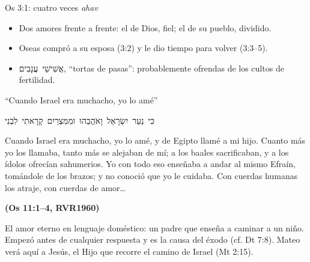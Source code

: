 \documentclass[hyperref={bookmarks=false},aspectratio=169]{beamer}
\newcommand{\heb}[1]{\mbox{\foreignlanguage{hebrew}{#1}}}
\newcommand{\SENOR}{S{\fontsize{0.78em}{1em}\selectfont EÑOR}}
\newcommand{\fuente}[1]{\par\hfill{\upshape\bfseries\footnotesize\textcolor{azul}{#1}}}
\begin{document}
\begin{frame}{Os 3:1: cuatro veces \emph{ahav}}
\centering
{}\par\bigskip
\small\begin{itemize}
\item Dos amores frente a frente: el de Dios, fiel; el de su pueblo, dividido.
\item Oseas compró a su esposa (3:2) y le dio tiempo para volver (3:3--5).
\item \heb{אֲשִׁישֵׁי עֲנָבִים}, ``tortas de pasas'': probablemente ofrendas de los cultos de fertilidad.
\end{itemize}
\end{frame}

\begin{frame}{``Cuando Israel era muchacho, yo lo amé''}
\begin{center}\heb{כִּי נַעַר יִשְׂרָאֵל וָאֹהֲבֵהוּ וּמִמִּצְרַיִם קָרָאתִי לִבְנִי}\end{center}
\begin{cita}Cuando Israel era muchacho, yo lo amé, y de Egipto llamé a mi hijo. Cuanto más yo los llamaba, tanto más se alejaban de mí; a los baales sacrificaban, y a los ídolos ofrecían sahumerios. Yo con todo eso enseñaba a andar al mismo Efraín, tomándole de los brazos; y no conoció que yo le cuidaba. Con cuerdas humanas los atraje, con cuerdas de amor\ldots\fuente{(Os 11:1--4, RVR1960)}\end{cita}
\small El amor eterno en lenguaje doméstico: un padre que enseña a caminar a un niño. Empezó antes de cualquier respuesta y es la causa del éxodo (cf. Dt 7:8). Mateo verá aquí a Jesús, el Hijo que recorre el camino de Israel (Mt 2:15).
\end{frame}
\end{document}
